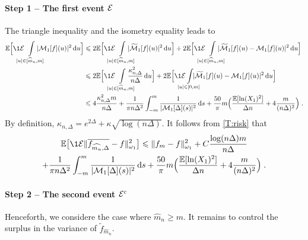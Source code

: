 \paragraph{\textbf{Step 1} -- The first event $\mathcal{E}$}
The triangle inequality and the isometry equality leads to 
{\small
\begin{align*}
    \EE \Big[ \1{\Ecal} \hspace{-0.4cm} \int_{|u| \in [\hat{m}_n, m]} \limits\hspace{-0.5cm} |\Mcal_1[f](u)|^2 \diff u \Big]
    &\leq 2 \EE \Big[ \1{\Ecal} \hspace{-0.4cm} \int_{|u| \in [\hat{m}_n, m]} \limits\hspace{-0.5cm} |\tilde\Mcal_1[f](u)|^2 \diff u \Big]  + 2 \EE \Big[ \1{\Ecal} \hspace{-0.4cm} \int_{|u| \in [\hat{m}_n, m]} \limits\hspace{-0.5cm} |\tilde\Mcal_1[f](u) - \Mcal_1[f](u)|^2 \diff u \Big]  \\
    &\leq 2 \EE \Big[ \1{\Ecal} \hspace{-0.4cm} \int_{|u| \in [\hat{m}_n, m]} \limits\hspace{-0.5cm} \frac{  \kappa_{n,\Delta}^2}{n\Delta} \diff u \Big]  + 2 \EE \Big[ \1{\Ecal} \hspace{-0.4cm} \int_{|u| \in [0, m]} \limits\hspace{-0.5cm} |\tilde\Mcal_1[f](u) - \Mcal_1[f](u)|^2 \diff u \Big]  \\
    &\leq 4 \frac{\kappa_{n,\Delta}^2 m}{n\Delta} + \frac{1}{\pi n \Delta^2} \int_{-m}^{m}\frac{1}{|\Mcal_1[\Delta](s)|^2}\diff s 
    + \frac{50}{\pi}m \Big(\frac{\EE[\ln(X_1)^2]}{\Delta n} + 4 \frac{m}{(n \Delta)^{2}} \Big)
    \eqfinp
\end{align*}
}
By definition, $\kappa_{n,\Delta} = e^{2\Delta} + \kappa \sqrt{\log(n\Delta)}$. It follows from \cref{T:risk} that
\begin{multline*}
    \EE \big[ \1{\Ecal}\|\bar{f_{\hat{m_n}, \Delta}}  - f \|_{\omega_1}^2\big] \leq \| f_m - f \|_{\omega_1}^2 + C\frac{\log(n\Delta)m}{n\Delta} \\
    + \frac{1}{\pi n \Delta^2} \int_{-m}^{m}\frac{1}{|\Mcal_1[\Delta](s)|^2}\diff s 
    + \frac{50}{\pi}m \Big(\frac{\EE[\ln(X_1)^2]}{\Delta n} + 4 \frac{m}{(n \Delta)^{2}} \Big)
    \eqfinp
\end{multline*}

\vspace{1em}
\paragraph{\textbf{Step 2} -- The second event $\mathcal{E}^c$} Henceforth, we considere the case where $\hat{m}_n \geq m$. It remains to control the surplus in the variance of $\tilde f_{\hat m_n}$.

